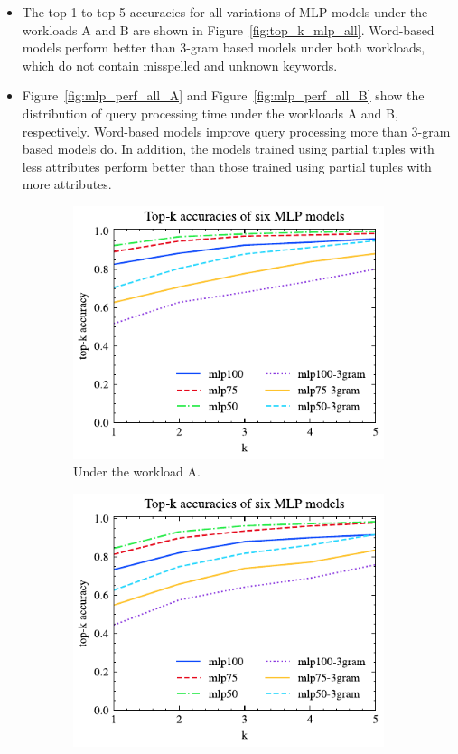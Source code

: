 \begin{itemize}
	\item The top-1 to top-5 accuracies for all variations of MLP models under the workloads A and B are shown in Figure~\ref{fig:top_k_mlp_all}. Word-based models perform better than 3-gram based models under both workloads, which do not contain misspelled and unknown keywords.
	\item Figure~\ref{fig:mlp_perf_all_A} and Figure~\ref{fig:mlp_perf_all_B} show the distribution of query processing time under the workloads A and B, respectively. Word-based models improve query processing more than 3-gram based models do. In addition, the models trained using partial tuples with less attributes perform better than those trained using partial tuples with more attributes.
\end{itemize}
\begin{figure}[!th]
	\centering
	\begin{subfigure}{0.45\textwidth}
		\centering
%		
		\includegraphics[]{my/graphics/top_k_mlp_A.pdf}
		\caption{Under the workload A.}
		\label{fig:top_k_mlp_A}
	\end{subfigure}
	\hfill
	\begin{subfigure}{0.45\textwidth}
		\centering
%		
		\includegraphics[]{my/graphics/top_k_mlp_B.pdf}

\end{subfigure}
\end{figure}
